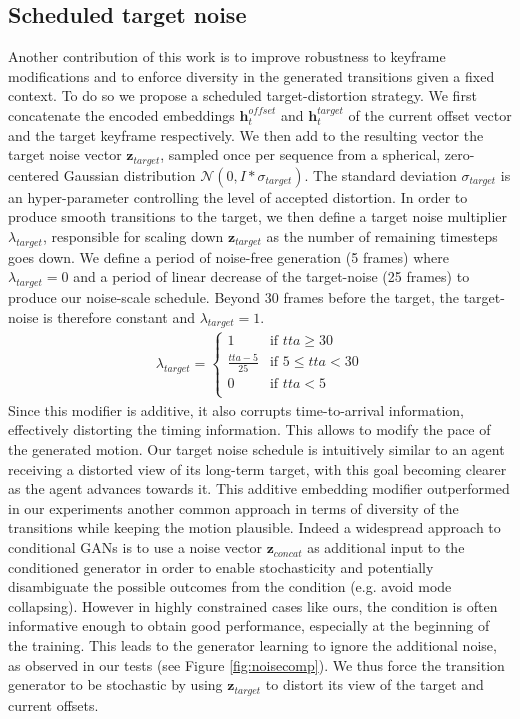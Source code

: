 \documentclass[acmtog]{acmart}
\newcommand{\bz}{\textbf{z}}
\newcommand{\bh}{\textbf{h}}
\begin{document}
\subsection{Scheduled target noise}\label{sec:targetnoise}
Another contribution of this work is to improve robustness to keyframe modifications and to enforce diversity in the generated transitions given a fixed context. To do so we propose a scheduled target-distortion strategy.  We first concatenate the encoded embeddings $\bh_t^\mathit{offset}$ and $\bh_t^\mathit{target}$ of the current offset vector and the target keyframe respectively. We then add to the resulting vector the target noise vector $\bz_{\mathit{target}}$, sampled once per sequence from a spherical, zero-centered Gaussian distribution $\mathcal{N}(0, I * \sigma_{\mathit{target}})$. The standard deviation $\sigma_{\mathit{target}}$ is an hyper-parameter controlling the level of accepted distortion. In order to produce smooth transitions to the target, we then define a target noise multiplier $\lambda_{\mathit{target}}$, responsible for scaling down $\bz_{\mathit{target}}$ as the number of remaining timesteps goes down. We define a period of noise-free generation (5 frames) where $\lambda_{\mathit{target}}=0$ and a period of linear decrease of the target-noise (25 frames) to produce our noise-scale schedule. Beyond 30 frames before the target, the target-noise is therefore constant and $\lambda_{\mathit{target}} = 1$. 
\begin{align}
    \lambda_{\mathit{target}}= 
        \begin{cases}
            1                    & \text{if } \mathit{tta} \geq 30\\
            \frac{\mathit{tta - 5}}{25}   & \text{if } 5 \leq \mathit{tta} < 30\\
            0                   & \text{if } \mathit{tta} < 5\\
        \end{cases}
\end{align}
Since this modifier is additive, it also corrupts time-to-arrival information, effectively distorting the timing information. This allows to modify the pace of the generated motion. Our target noise schedule is intuitively similar to an agent receiving a distorted view of its long-term target, with this goal becoming clearer as the agent advances towards it. This additive embedding modifier outperformed in our experiments another common approach in terms of diversity of the transitions while keeping the motion plausible. Indeed a widespread approach to conditional GANs is to use a noise vector $\bz_{\mathit{concat}}$ as additional input to the conditioned generator in order to enable stochasticity and potentially disambiguate the possible outcomes from the condition (e.g. avoid mode collapsing). However in highly constrained cases like ours, the condition is often informative enough to obtain good performance, especially at the beginning of the training. This leads to the generator learning to ignore the additional noise, as observed in our tests (see Figure \ref{fig:noisecomp}). We thus force the transition generator to be stochastic by using $\bz_{\mathit{target}}$ to distort its view of the target and current offsets. 
\end{document}
